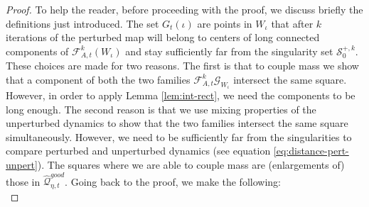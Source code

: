 \documentclass{amsart}
\numberwithin{equation}{section}
\newcommand\cF{{\mathcal F}}
\newcommand\cG{{\mathcal G}}
\newcommand\cQ{{\mathcal Q}}
\newcommand\cS{{\mathcal S}}
\newcommand{\catt}{\cF_{A,t}}
\begin{document}
\begin{proof}
To help the reader, before proceeding with the proof, we discuss briefly the definitions just introduced. The set \(G_t (\iota) \) are points in \(W_{\iota}\) that after \(k\) iterations of the perturbed map will belong to centers of long connected components of \(\catt^k(W_{\iota})\) and stay sufficiently far from the singularity set \(\cS_{0}^{+,k}\). These choices are made for two reasons. The first is that to couple mass we show that a component of both the two families \(\catt^k \cG_{W_{\iota}}\) intersect the same square. However, in order to apply Lemma \ref{lem:int-rect}, we need the components to be long enough. The second reason is that we use mixing properties of the unperturbed dynamics to show that the two families intersect the same square simultaneously. However, we need to be sufficiently far from the singularities to compare perturbed and unperturbed dynamics (see equation \eqref{eq:distance-pert-unpert}). The squares where we are able to couple mass are (enlargements of) those in \(\widehat\cQ_{\eta, t}^{good}\). Going back to the proof, we make the following:\\


\end{proof}
\end{document}
